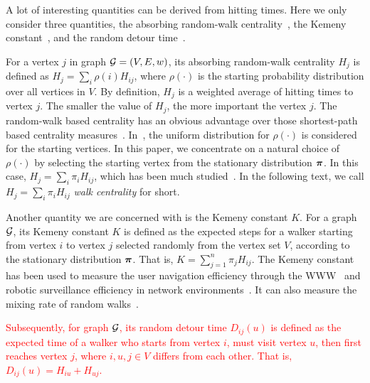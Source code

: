 \documentclass[10pt,twocolumn,twoside]{IEEEtran}
\begin{document}
A lot of interesting quantities can be derived from hitting times. Here we only consider three quantities, the absorbing random-walk centrality~\cite{WhSm03,MaMaGi15}, the Kemeny constant~\cite{Hu14}, and the random detour time~\cite{BoRaZh11,RaZh13}.

For a vertex \(j\) in graph \(\mathcal{G}=(V,E,w)\), its absorbing random-walk centrality \(H_j\) is defined as \(H_j=\sum_{i} \rho(i) H_{ij}\), where \(\rho(\cdot)\) is the starting probability distribution over all vertices in \(V\). By definition, \(H_j\) is a weighted average of hitting times to vertex \(j\). The smaller the value of \(H_j\), the more important the vertex \(j\). The random-walk based centrality has an obvious advantage over those shortest-path based centrality measures~\cite{Ne05}. In~\cite{WhSm03,MaMaGi15}, the uniform distribution for \(\rho(\cdot)\) is considered for the starting  vertices. In this paper, we concentrate on a natural choice of  \(\rho(\cdot)\) by selecting the starting vertex from the stationary distribution \(\boldsymbol{\pi}\). In this case, \(H_j=\sum_{i} \pi_i H_{ij}\), which has been much studied~\cite{TeBeVo09,Be09,Be16}. In the following text, we  call \(H_j=\sum_{i} \pi_i H_{ij}\) \textit{walk centrality} for short.

Another quantity we are concerned with is the Kemeny constant \(K\). For a graph \(\mathcal{G}\), its Kemeny constant \(K\) is defined as the expected steps for a walker starting from  vertex \(i\) to vertex \(j\) selected randomly from the vertex set \(V\), according to the stationary distribution \(\boldsymbol{\pi}\). That is, \(K = \sum_{j = 1}^{n} \pi_j H_{ij}\). The Kemeny constant has been used to measure the user navigation efficiency through the WWW~\cite{LeLo02} and  robotic surveillance efficiency in network environments~\cite{PaAgBu15}. It can also measure the mixing rate of random walks~\cite{LePeWi09}.

\textcolor{red}{Subsequently, for graph \(\mathcal{G}\), its random detour time \(D_{ij}(u)\) is defined as the expected time of a walker who starts from vertex \(i\), must visit vertex \(u\), then first reaches vertex \(j\), where \(i,u,j\in V\) differs from each other.
That is, \(D_{ij}(u)= H_{iu}+H_{uj}\).}
\end{document}
